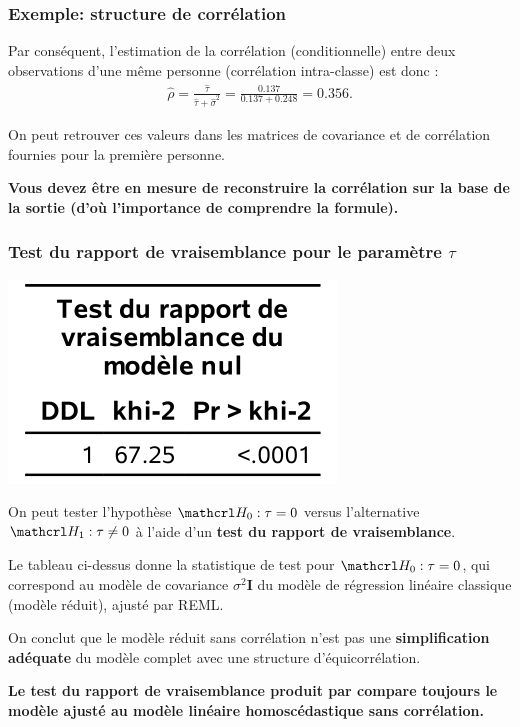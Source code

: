 \documentclass{beamer}
\begin{document}
\begin{frame}[fragile]
\frametitle{Exemple: structure de corrélation}
\bi

\item Par conséquent, l'estimation de la corrélation (conditionnelle) entre deux
observations d'une même personne (corrélation intra-classe) est donc :
\begin{align*}
\hat{\rho}=\frac{\hat{\tau}}{\hat{\tau}+\hat{\sigma}^2}=\frac{0.137}{0.137+0.248}=0.356.
\end{align*}
\item On peut retrouver ces valeurs dans les matrices de covariance et de
corrélation fournies pour la première personne.
\item \textbf{Vous devez être en mesure de reconstruire la corrélation sur la base de la sortie (d'où l'importance de comprendre la formule).}
\ei
\end{frame}



\begin{frame}[fragile]
\frametitle{Test du rapport de vraisemblance pour le paramètre $\tau$}

\begin{center}
\includegraphics[width = 0.35\linewidth]{img/c5/diapos6-e09}
\end{center}
\bi
\item 
On peut tester l'hypothèse $\Hy_0:\tau=0$ versus l'alternative $\Hy_1: \tau \neq 0$ à l'aide d'un \textbf{test du rapport de vraisemblance}.
\item Le tableau ci-dessus donne la statistique de test pour $\Hy_0: \tau=0$, qui correspond au modèle de covariance $\sigma^2\mathbf{I}$ du modèle de régression linéaire classique (modèle réduit), ajusté par REML.
\item On conclut que le modèle réduit sans corrélation n'est pas une \textbf{simplification adéquate} du modèle complet  avec une structure d'équicorrélation.
\item \textbf{Le test du rapport de vraisemblance produit par \SASlang{}{} compare toujours le modèle ajusté au modèle linéaire homoscédastique sans corrélation.}
\ei
\end{frame}
\end{document}
